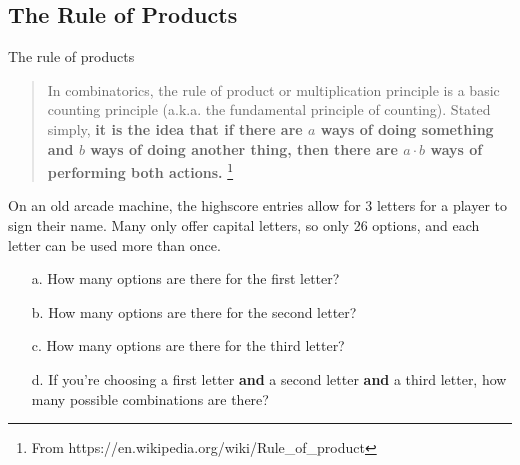     \hrulefill

    \subsection{The Rule of Products}

    \begin{intro}{The rule of products}
        \begin{quote}
        In combinatorics, the rule of product or multiplication principle is a
        basic counting principle (a.k.a. the fundamental principle of counting).
        Stated simply,
        \textbf{it is the idea that if there are $a$ ways of doing something and $b$
        ways of doing another thing, then there are $a \cdot b$ ways of performing both actions.}
        \footnote{From https://en.wikipedia.org/wiki/Rule\_of\_product}
        \end{quote}
    \end{intro}

    \begin{questionNOGRADE}{\thequestion}
        On an old arcade machine, the highscore entries allow for
        3 letters for a player to sign their name. Many only offer capital letters,
        so only 26 options, and each letter can be used more than once.
        
        \begin{enumerate}
            \item[a.]   How many options are there for the first letter?
            \item[b.]   How many options are there for the second letter?
            \item[c.]   How many options are there for the third letter?
            \item[d.]   If you're choosing a first letter \textbf{and} a second letter \textbf{and} a third letter,
                        how many possible combinations are there?
        \end{enumerate}
    \end{questionNOGRADE}
    



